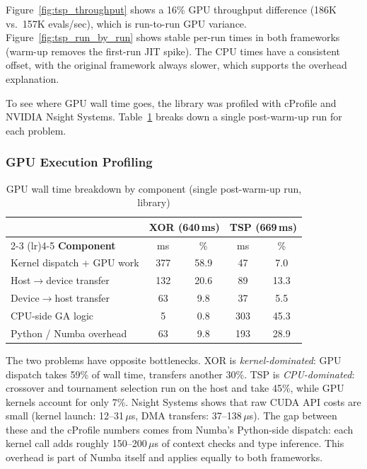 \documentclass[a4paper,14pt]{extarticle}
\begin{document}
Figure~\ref{fig:tsp_throughput} shows a 16\% GPU throughput difference (186K vs.\ 157K evals/sec), which is run-to-run GPU variance. Figure~\ref{fig:tsp_run_by_run} shows stable per-run times in both frameworks (warm-up removes the first-run JIT spike). The CPU times have a consistent offset, with the original framework always slower, which supports the overhead explanation.

To see where GPU wall time goes, the library was profiled with cProfile and NVIDIA Nsight Systems. Table~\ref{tab:gpu_profile} breaks down a single post-warm-up run for each problem.


\subsubsection*{GPU Execution Profiling}

\begin{table}[H]
\centering
\caption{GPU wall time breakdown by component (single post-warm-up run, library)}
\label{tab:gpu_profile}
\begin{tabular}{lcccc}
\toprule
 & \multicolumn{2}{c}{\textbf{XOR (640\,ms)}} & \multicolumn{2}{c}{\textbf{TSP (669\,ms)}} \\
\cmidrule(lr){2-3} \cmidrule(lr){4-5}
\textbf{Component} & ms & \% & ms & \% \\
\midrule
Kernel dispatch + GPU work & 377 & 58.9 & 47 & 7.0 \\
Host$\to$device transfer & 132 & 20.6 & 89 & 13.3 \\
Device$\to$host transfer & 63 & 9.8 & 37 & 5.5 \\
CPU-side GA logic & 5 & 0.8 & 303 & 45.3 \\
Python / Numba overhead & 63 & 9.8 & 193 & 28.9 \\
\bottomrule
\end{tabular}
\end{table}

The two problems have opposite bottlenecks. XOR is \emph{kernel-dominated}: GPU dispatch takes 59\% of wall time, transfers another 30\%. TSP is \emph{CPU-dominated}: crossover and tournament selection run on the host and take 45\%, while GPU kernels account for only 7\%. Nsight Systems shows that raw CUDA API costs are small (kernel launch: 12--31\,$\mu$s, DMA transfers: 37--138\,$\mu$s). The gap between these and the cProfile numbers comes from Numba's Python-side dispatch: each kernel call adds roughly 150--200\,$\mu$s of context checks and type inference. This overhead is part of Numba itself and applies equally to both frameworks.
\end{document}
